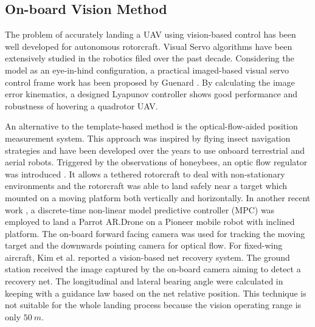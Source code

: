 \subsection{On-board Vision Method}
The problem of accurately landing a UAV using vision-based control has been well developed for autonomous rotorcraft. Visual Servo algorithms have been extensively studied in the robotics filed over the past decade. Considering the model as an eye-in-hind configuration, a practical imaged-based visual servo control frame work has been proposed by Guenard \cite{Guenard2008}. By calculating the image error kinematics, a designed Lyapunov controller shows good performance and robustness of hovering a quadrotor UAV. 


An alternative to the template-based method is the optical-flow-aided position measurement system. This approach was inspired by flying insect navigation strategies \cite{Green2004} and have been developed over the years to use onboard terrestrial and aerial robots. Triggered by the observations of honeybees, an optic flow regulator was introduced \cite{Ruffier2014}. It allows a tethered rotorcraft to deal with non-stationary environments and the rotorcraft was able to land safely near a target which mounted on a moving platform both vertically and horizontally. In another recent work \cite{Vlantis2015}, a discrete-time non-linear model predictive controller (MPC) was employed to land a Parrot AR.Drone on a Pioneer mobile robot with inclined platform. The on-board forward facing camera was used for tracking the moving target and the downwards pointing camera for optical flow. For fixed-wing aircraft, Kim et al.\cite{Kim2013} reported a vision-based net recovery system. The ground station received the image captured by the on-board camera aiming to detect a recovery net. The longitudinal and lateral bearing angle were calculated in keeping with a guidance law based on the net relative position. This technique is not suitable for the whole landing process because the vision operating range is only $50\ m$.



